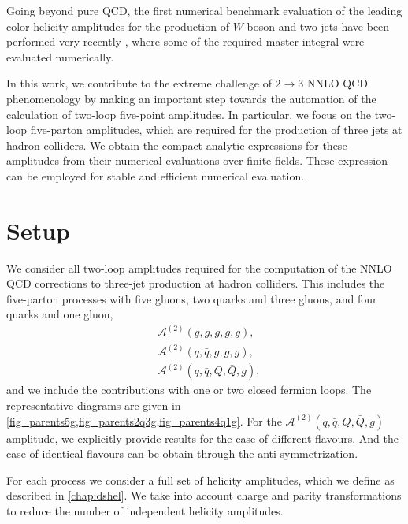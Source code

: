 Going beyond pure QCD, the first numerical benchmark evaluation of the leading color helicity amplitudes for the production of $W$-boson and two jets 
have been performed very recently \cite{Hartanto:2019uvl}, where some of the required master integral were evaluated numerically.

In this work, we contribute to the extreme challenge of $2\to 3$ NNLO QCD phenomenology by
making an important step towards the automation of the calculation of two-loop five-point amplitudes.
In particular, we focus on the two-loop five-parton amplitudes,
which are required for the production of three jets at hadron colliders.
We obtain the compact analytic expressions for these amplitudes from their numerical evaluations over finite fields.
These expression can be employed for stable and efficient numerical evaluation.

\section{Setup}
\label{5parton:sec:amplitudes}

We consider all
two-loop amplitudes required for the computation of the NNLO QCD corrections to three-jet production at
hadron colliders.
This includes the
five-parton processes with five gluons, two quarks and three gluons, and four
quarks and one gluon,  
\begin{align*}
  &\mathcal{A}^{(2)}(g,g,g,g,g), \\
  &\mathcal{A}^{(2)}(q,\bar{q},g,g,g), \\
  &\mathcal{A}^{(2)}(q,\bar{q},Q,\bar{Q},g),
\end{align*}
and we include the contributions with one or two closed fermion loops.
The representative diagrams are given in \cref{fig_parents5g,fig_parents2q3g,fig_parents4q1g}.
For the $\mathcal{A}^{(2)}(q,\bar{q},Q,\bar{Q},g)$ amplitude, we explicitly provide results for the case 
of different flavours. And the case of identical flavours can be obtain through the anti-symmetrization.

For each process we consider a full set of helicity amplitudes, which we 
define as described in \cref{chap:dshel}.
We take into account charge and parity transformations to reduce
the number of independent helicity amplitudes.

